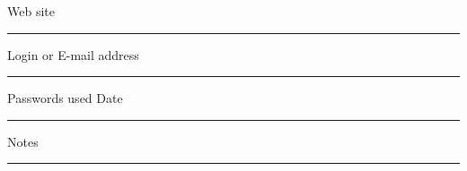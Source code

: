 \clearpage

\noindent Web site \
\vspace{-.05in} \\ \rule{\textwidth}{.2pt}
\vspace{0.4in}

\noindent Login or E-mail address \
\vspace{-.05in} \\ \rule{\textwidth}{.2pt}
\vspace{0.4in}

\noindent Passwords used
\hspace{1.25in}
Date \
\vspace{-.05in} \\ \rule{\textwidth}{.2pt}
\vspace{1.4in}

\noindent Notes \
\vspace{-.05in} \\ \rule{\textwidth}{.2pt}
